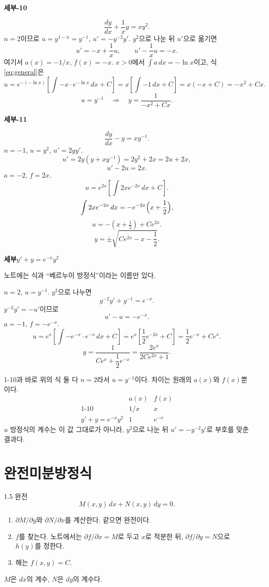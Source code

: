 \documentclass[11pt]{article}
\newcommand{\ex}[1]{\par\textbf{세부\quad #1}\par}
\begin{document}
\ex{1-10}
\[
\frac{dy}{dx}+\frac{1}{x}y=xy^{2}.
\]
\(n=2\)이므로 \(u=y^{1-n}=y^{-1}\), \(u'=-y^{-2}y'\).
\(y^{2}\)으로 나눈 뒤 \(u'\)으로 옮기면
\[
u'=-x+\frac{1}{x}u,\qquad
u'-\frac{1}{x}u=-x.
\]
여기서 \(a(x)=-1/x\), \(f(x)=-x\). \(x>0\)에서 \(\int a\,dx=-\ln x\)이고, 식 \eqref{eq:general}은
\[
u=e^{-(-\ln x)}\left[\int -x\cdot e^{-\ln x}\,dx+C\right]
=x\left[\int -1\,dx+C\right]
=x(-x+C)=-x^{2}+Cx.
\]
\[
u=y^{-1}\quad\Rightarrow\quad
y=\frac{1}{-x^{2}+Cx}.
\]

\ex{1-11}
\[
\frac{dy}{dx}-y=xy^{-1}.
\]
\(n=-1\), \(u=y^{2}\), \(u'=2yy'\).
\[
u'=2y(y+xy^{-1})=2y^{2}+2x=2u+2x,
\]
\[
u'-2u=2x.
\]
\(a=-2\), \(f=2x\).
\[
u=e^{2x}\left[\int 2xe^{-2x}\,dx+C\right].
\]
\[
\int 2xe^{-2x}\,dx=-e^{-2x}\Bigl(x+\frac12\Bigr),
\]
\[
u=-(x+\tfrac12)+Ce^{2x}.
\]
\[
y=\pm\sqrt{Ce^{2x}-x-\frac12}.
\]

\ex{\(y'+y=e^{-x}y^{2}\)}
노트에는 식과 ``베르누이 방정식''이라는 이름만 있다.

\begin{fillbox}
\(n=2\), \(u=y^{-1}\). \(y^{2}\)으로 나누면
\[
y^{-2}y'+y^{-1}=e^{-x}.
\]
\(y^{-2}y'=-u'\)이므로
\[
u'-u=-e^{-x}.
\]
\(a=-1\), \(f=-e^{-x}\).
\[
u=e^{x}\left[\int -e^{-x}\cdot e^{-x}\,dx+C\right]
=e^{x}\left[\frac12 e^{-2x}+C\right]
=\frac12 e^{-x}+Ce^{x}.
\]
\[
y=\frac{1}{Ce^{x}+\dfrac12 e^{-x}}
=\frac{2e^{x}}{2Ce^{2x}+1}.
\]
\end{fillbox}

\begin{relbox}{1-10과 바로 위의 식}
둘 다 \(n=2\)라서 \(u=y^{-1}\)이다. 차이는 원래의 \(a(x)\)와 \(f(x)\)뿐이다.
\[
\begin{array}{c|cc}
 & a(x) & f(x)\\
\hline
\text{1-10} & 1/x & x\\
y'+y=e^{-x}y^{2} & 1 & e^{-x}
\end{array}
\]
\(u\) 방정식의 계수는 이 값 그대로가 아니라, \(y^{2}\)으로 나눈 뒤 \(u'=-y^{-2}y'\)로 부호를 맞춘 결과다.
\end{relbox}

\section{완전미분방정식}

\begin{mainbox}{1.5 완전}
\[
M(x,y)\,dx+N(x,y)\,dy=0.
\]
\begin{enumerate}
\item \(\partial M/\partial y\)와 \(\partial N/\partial x\)를 계산한다. 같으면 완전이다.
\item \(f\)를 찾는다. 노트에서는 \(\partial f/\partial x=M\)로 두고 \(x\)로 적분한 뒤, \(\partial f/\partial y=N\)으로 \(h(y)\)를 정한다.
\item 해는 \(f(x,y)=C\).
\end{enumerate}
\(M\)은 \(dx\)의 계수, \(N\)은 \(dy\)의 계수다.
\end{mainbox}
\end{document}
